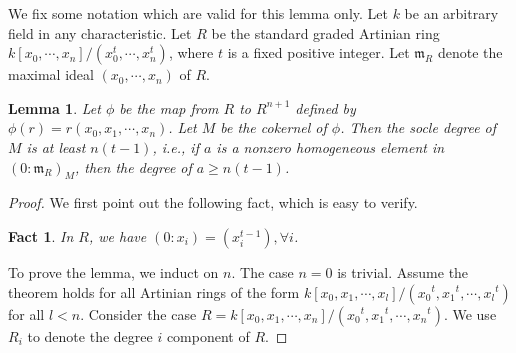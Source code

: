 \documentclass[draft]{amsart}
\newtheorem{lemma}[theorem]{Lemma}
\newtheorem{fact}{Fact}
\theoremstyle{definition}
\numberwithin{equation}{theorem}
\begin{document}
We fix some notation which are valid for this lemma only. Let $k$ be an arbitrary field in any characteristic. Let $R$ be the standard graded Artinian ring $k[x_0,\cdots, x_n]/(x_0^t, \cdots, x_n^t)$, where $t$ is a fixed positive integer. Let ${\mathfrak{m}}_R$ denote the maximal ideal $(x_0, \cdots, x_n)$ of $R$.
\begin{lemma} \label{soc}Let $\phi$ be the map from $R$ to $R^{n+1}$ defined by $\phi(r)=r(x_0,x_1,\cdots, x_n)$. Let $M$ be the cokernel of $\phi$. Then the socle degree of $M$ is at least $n(t-1)$, i.e., if $a$ is a nonzero homogeneous element in $(0:{\mathfrak{m}}_R)_M$, then the degree of $a\geq n(t-1)$. 

\end{lemma}

 \begin{proof} We first point out the following fact, which is easy to verify.
\begin{fact}\label{fact} In $R$, we have $(0:x_i)=(x_i^{t-1}), \forall i$.
\end{fact}

To prove the lemma, we induct on $n$. The case $n=0$ is trivial.
Assume the theorem holds for all Artinian rings of the form $k[x_0,x_1, \cdots, x_l]/({x_0}^t, {x_1}^t, \cdots, {x_l}^t)$ for all $l<n$. Consider the case  $R=k[x_0,x_1, \cdots, x_n]/({x_0}^t, {x_1}^t, \cdots, {x_n}^t)$. We use $R_i$ to denote the degree $i$ component of $R$.
 

\end{proof}
\end{document}
